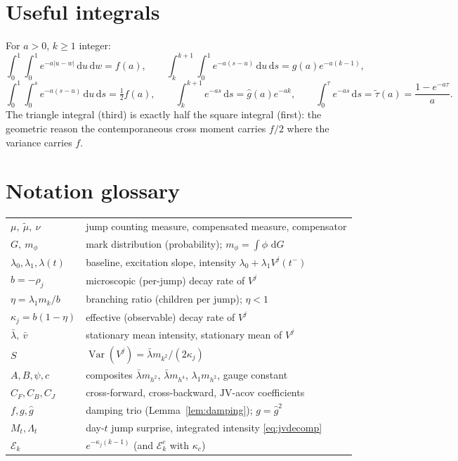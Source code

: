 \documentclass[11pt]{report}
\theoremstyle{definition}
\theoremstyle{remark}
\newcommand{\Var}{\operatorname{Var}}
\newcommand{\dd}{\,\mathrm{d}}
\newcommand{\Vj}{V^{j}}
\newcommand{\JV}{\mathrm{JV}}
\newcommand{\mk}{m_{k}}
\newcommand{\mkk}{m_{k^{2}}}
\newcommand{\mh}{m_{h^{2}}}
\newcommand{\mhh}{m_{h^{4}}}
\begin{document}
\chapter{Useful integrals}
\label{app:integrals}
For $a>0$, $k\ge1$ integer:
\[
\int_{0}^{1}\!\!\int_{0}^{1}e^{-a|u-w|}\dd u\dd w=f(a),\qquad
\int_{k}^{k+1}\!\!\int_{0}^{1}e^{-a(s-u)}\dd u\dd s=g(a)e^{-a(k-1)},
\]
\[
\int_{0}^{1}\!\!\int_{0}^{s}e^{-a(s-u)}\dd u\dd s=\tfrac{1}{2}f(a),\qquad
\int_{k}^{k+1}e^{-as}\dd s=\hat g(a)e^{-ak},\qquad
\int_{0}^{\tau}e^{-as}\dd s=\tilde\tau(a)=\frac{1-e^{-a\tau}}{a}.
\]
The triangle integral (third) is exactly half the square integral (first):
the geometric reason the contemporaneous cross moment carries $f/2$ where
the variance carries $f$.

\chapter{Notation glossary}
\label{app:notation}
\begin{center}
\begin{tabular}{ll}
\toprule
$\mu,\ \tilde\mu,\ \nu$ & jump counting measure, compensated measure, compensator\\
$G,\ m_{\phi}$ & mark distribution (probability); $m_{\phi}=\int\phi\,\dd G$\\
$\lambda_{0},\lambda_{1},\lambda(t)$ & baseline, excitation slope, intensity $\lambda_0+\lambda_1\Vj(t^-)$\\
$b=-\rho_{j}$ & microscopic (per-jump) decay rate of $\Vj$\\
$\eta=\lambda_{1}\mk/b$ & branching ratio (children per jump); $\eta<1$\\
$\kappa_{j}=b(1-\eta)$ & effective (observable) decay rate of $\Vj$\\
$\bar\lambda,\ \bar v$ & stationary mean intensity, stationary mean of $\Vj$\\
$S$ & $\Var(\Vj)=\bar\lambda\mkk/(2\kappa_{j})$\\
$A,B,\psi,c$ & composites $\bar\lambda\mh$, $\bar\lambda\mhh$, $\lambda_{1}\mh$, gauge constant\\
$C_{F},C_{B},C_{J}$ & cross-forward, cross-backward, $\JV$-acov coefficients\\
$f,g,\hat g$ & damping trio (Lemma~\ref{lem:damping}); $g=\hat g^{2}$\\
$M_{t},\Lambda_{t}$ & day-$t$ jump surprise, integrated intensity \eqref{eq:jvdecomp}\\
$\mathcal{E}_{k}$ & $e^{-\kappa_{j}(k-1)}$ (and $\mathcal{E}^{c}_{k}$ with $\kappa_{c}$)\\
\bottomrule
\end{tabular}
\end{center}
\end{document}
